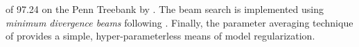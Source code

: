 \documentclass[smallextended]{svjour3}       %
\DeclareMathOperator*{\argmax}{arg\,max}
\DeclareMathOperator*{\argmin}{arg\,min}
\begin{document}
of 97.24 on the Penn Treebank \citep{marcus1993} by \citet{huang2012}. The beam search is implemented using \emph{minimum divergence beams} following \citet{pal2006}. Finally, the parameter averaging technique of \citet{freund1999} provides a simple, hyper-parameterless means of model regularization. 




%
%
\end{document}
